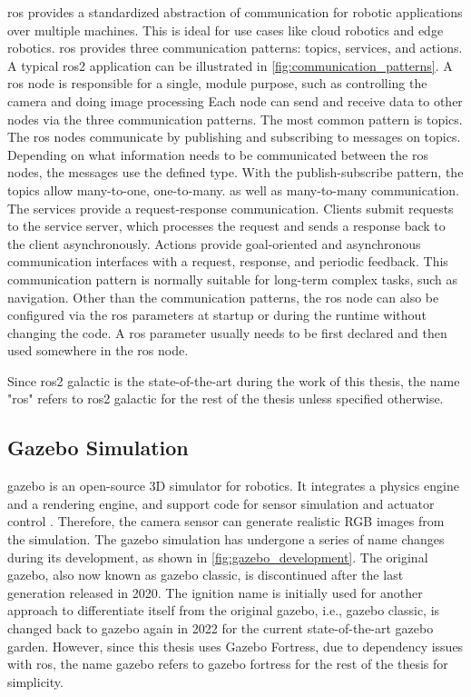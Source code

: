 \gls{ros} provides a standardized abstraction of communication for robotic applications over multiple machines. This is ideal for use cases like cloud robotics and edge robotics. \gls{ros} provides three communication patterns: topics, services, and actions. A typical \gls{ros}2 application can be illustrated in \cref{fig:communication_patterns}. A \gls{ros} node is responsible for a single, module purpose, such as controlling the camera and doing image processing \cite{ROSGalactic2021} Each node can send and receive data to other nodes via the three communication patterns. The most common pattern is topics. The \gls{ros} nodes communicate by publishing and subscribing to messages on topics. Depending on what information needs to be communicated between the \gls{ros} nodes, the messages use the defined type. With the publish-subscribe pattern, the topics allow many-to-one, one-to-many. as well as many-to-many communication. The services provide a request-response communication. Clients submit requests to the service server, which processes the request and sends a response back to the client asynchronously. Actions provide goal-oriented and asynchronous communication interfaces with a request, response, and periodic feedback. This communication pattern is normally suitable for long-term complex tasks, such as navigation. Other than the communication patterns, the \gls{ros} node can also be configured via the \gls{ros} parameters at startup or during the runtime without changing the code. A \gls{ros} parameter usually needs to be first declared and then used somewhere in the \gls{ros} node. 

Since \gls{ros}2 galactic is the state-of-the-art during the work of this thesis, the name "\gls{ros}" refers to \gls{ros}2 galactic for the rest of the thesis unless specified otherwise. 

\subsection{Gazebo Simulation}


\gls{gazebo} is an open-source 3D simulator for robotics. It integrates a physics engine and a rendering engine, and support code for sensor simulation and actuator control \cite{GazeboWiki}. Therefore, the camera sensor can generate realistic RGB images from the simulation. The \gls{gazebo} simulation has undergone a series of name changes during its development, as shown in \cref{fig:gazebo_development}. The original \gls{gazebo}, also now known as \gls{gazebo} classic, is discontinued after the last generation released in 2020. The ignition name is initially used for another approach to differentiate itself from the original \gls{gazebo}, i.e., \gls{gazebo} classic, is changed back to \gls{gazebo} again in 2022 for the current state-of-the-art \gls{gazebo} garden. However, since this thesis uses Gazebo Fortress, due to dependency issues with \gls{ros}, the name \gls{gazebo} refers to \gls{gazebo} fortress for the rest of the thesis for simplicity. 

